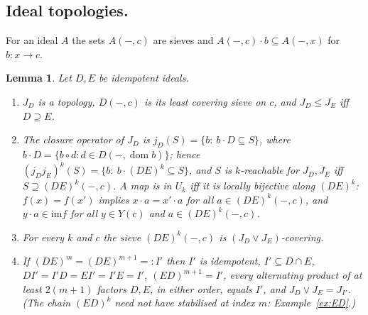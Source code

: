 \documentclass[11pt]{amsart}
\newtheorem{lem}[thm]{Lemma}
\theoremstyle{definition}
\newcommand{\im}{\mathrm{im}}
\begin{document}
\subsection*{Ideal topologies.}
For an ideal $A$ the sets $A(-,c)$ are sieves and $A(-,c)\cdot b\subseteq
A(-,x)$ for $b\colon x\to c$.
\begin{lem}\label{lem:ideal}
Let $D,E$ be idempotent ideals.
\begin{enumerate}
\item[(i)] $J_D$ is a topology, $D(-,c)$ is its least covering sieve on $c$,
and $J_D\le J_E$ iff $D\supseteq E$.
\item[(ii)] The closure operator of $J_D$ is $j_D(S)=\{b:\ b\cdot D\subseteq
S\}$, where $b\cdot D=\{b\circ d:d\in D(-,\operatorname{dom}b)\}$; hence
$(j_Dj_E)^k(S)=\{b:\ b\cdot(DE)^k\subseteq S\}$, and $S$ is $k$-reachable for
$J_D,J_E$ iff $S\supseteq(DE)^k(-,c)$. A map is in $U_k$ iff it is
\emph{locally bijective along $(DE)^k$}: $f(x)=f(x')$ implies $x\cdot a=
x'\cdot a$ for all $a\in(DE)^k(-,c)$, and $y\cdot a\in\im f$ for all $y\in Y(c)$
and $a\in(DE)^k(-,c)$.
\item[(iii)] For every $k$ and $c$ the sieve $(DE)^k(-,c)$ is
$(J_D\vee J_E)$-covering.
\item[(iv)] If $(DE)^m=(DE)^{m+1}=:I'$ then $I'$ is idempotent,
$I'\subseteq D\cap E$, $DI'=I'D=EI'=I'E=I'$, $(ED)^{m+1}=I'$, every
alternating product of at least $2(m+1)$ factors $D,E$, in either order,
equals $I'$, and $J_D\vee J_E=J_{I'}$. (The chain $(ED)^k$ need not have
stabilised at index $m$: Example~\ref{ex:ED}.)
\end{enumerate}
\end{lem}
\end{document}
